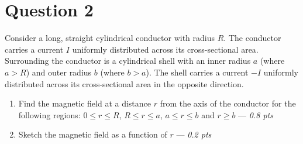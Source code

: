 \section*{Question 2}
Consider a long, straight cylindrical conductor with radius $R$. The conductor carries a current $I$ uniformly distributed across its cross-sectional area. Surrounding the conductor is a cylindrical shell with an inner radius $a$ (where $a>R$) and outer radius $b$ (where $b>a$). The shell carries a current $-I$ uniformly distributed across its cross-sectional area in the opposite direction.
\begin{enumerate}
\item[(a)] Find the magnetic field at a distance $r$ from the axis of the conductor for the following regions: $ 0 \leqslant r \leq R$, $ R \leqslant r \leq a$, $ a \leqslant r \leq b$ and $r \geqslant b$ --- \textit{0.8 pts}
\item[(b)] Sketch the magnetic field as a function of $r$ --- \textit{0.2 pts}
\end{enumerate}


